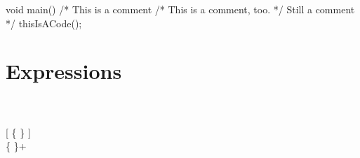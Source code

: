 \begin{code}
void main() {
	/* This is a comment
		/* This is a comment, too. */
		Still a comment */
	thisIsACode();
}
\end{code}

\chapter{Expressions}
\begin{grammar}
	  \\		
		\grAltLn {} \\
		
	 \kwd{(} [  \{ \kwd{,}  \} ] \kwd{)} \\
	
	 \{  \}+  \\
\end{grammar}

